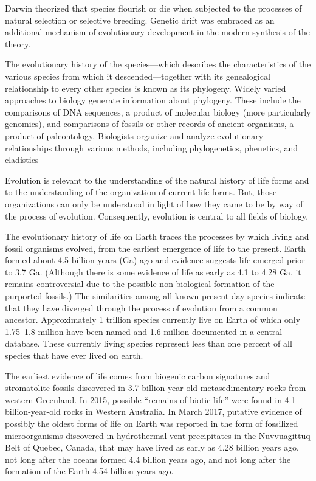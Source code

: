 \documentclass[
]{article}
\begin{document}
Darwin theorized that species flourish or die when subjected to the
processes of natural selection or selective breeding. Genetic drift was
embraced as an additional mechanism of evolutionary development in the
modern synthesis of the theory.

The evolutionary history of the species---which describes the
characteristics of the various species from which it
descended---together with its genealogical relationship to every other
species is known as its phylogeny. Widely varied approaches to biology
generate information about phylogeny. These include the comparisons of
DNA sequences, a product of molecular biology (more particularly
genomics), and comparisons of fossils or other records of ancient
organisms, a product of paleontology. Biologists organize and analyze
evolutionary relationships through various methods, including
phylogenetics, phenetics, and cladistics

Evolution is relevant to the understanding of the natural history of
life forms and to the understanding of the organization of current life
forms. But, those organizations can only be understood in light of how
they came to be by way of the process of evolution. Consequently,
evolution is central to all fields of biology.

The evolutionary history of life on Earth traces the processes by which
living and fossil organisms evolved, from the earliest emergence of life
to the present. Earth formed about 4.5 billion years (Ga) ago and
evidence suggests life emerged prior to 3.7 Ga. (Although there is some
evidence of life as early as 4.1 to 4.28 Ga, it remains controversial
due to the possible non-biological formation of the purported fossils.)
The similarities among all known present-day species indicate that they
have diverged through the process of evolution from a common ancestor.
Approximately 1 trillion species currently live on Earth of which only
1.75--1.8 million have been named and 1.6 million documented in a
central database. These currently living species represent less than one
percent of all species that have ever lived on earth.

The earliest evidence of life comes from biogenic carbon signatures and
stromatolite fossils discovered in 3.7 billion-year-old metasedimentary
rocks from western Greenland. In 2015, possible ``remains of biotic
life'' were found in 4.1 billion-year-old rocks in Western Australia. In
March 2017, putative evidence of possibly the oldest forms of life on
Earth was reported in the form of fossilized microorganisms discovered
in hydrothermal vent precipitates in the Nuvvuagittuq Belt of Quebec,
Canada, that may have lived as early as 4.28 billion years ago, not long
after the oceans formed 4.4 billion years ago, and not long after the
formation of the Earth 4.54 billion years ago.
\end{document}
